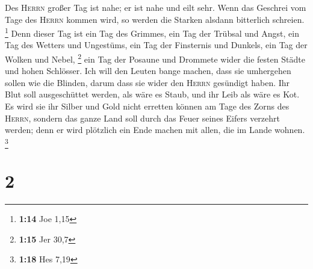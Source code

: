  Des \textsc{Herrn} großer Tag ist nahe; er ist nahe und
eilt sehr. Wenn das Geschrei vom Tage des \textsc{Herrn} kommen wird, so
werden die Starken alsdann bitterlich schreien. \footnote{\textbf{1:14}
  Joe 1,15}  Denn dieser Tag ist ein Tag des Grimmes, ein
Tag der Trübsal und Angst, ein Tag des Wetters und Ungestüms, ein Tag
der Finsternis und Dunkels, ein Tag der Wolken und Nebel, \footnote{\textbf{1:15}
  Jer 30,7}  ein Tag der Posaune und Drommete wider die
festen Städte und hohen Schlösser.  Ich will den Leuten
bange machen, dass sie umhergehen sollen wie die Blinden, darum dass sie
wider den \textsc{Herrn} gesündigt haben. Ihr Blut soll ausgeschüttet
werden, als wäre es Staub, und ihr Leib als wäre es Kot. 
Es wird sie ihr Silber und Gold nicht erretten können am Tage des Zorns
des \textsc{Herrn}, sondern das ganze Land soll durch das Feuer seines
Eifers verzehrt werden; denn er wird plötzlich ein Ende machen mit
allen, die im Lande wohnen. \footnote{\textbf{1:18} Hes 7,19}

\hypertarget{section-1}{%
\section{2}\label{section-1}}

